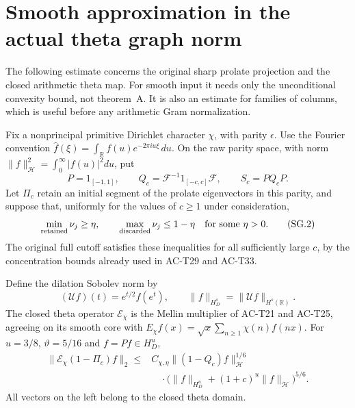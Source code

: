 \section{Smooth approximation in the actual theta graph norm}
\label{sec:spectral-prolate-graph}

The following estimate concerns the original sharp prolate
projection and the closed arithmetic theta map.  For smooth
input it needs only the unconditional convexity bound, not
theorem~A.  It is also an estimate for families of columns,
which is useful before any arithmetic Gram normalization.

\begin{theorem}
\label{AC-S29}
Fix a nonprincipal primitive Dirichlet character $\chi$,
with parity $\epsilon$.  Use the Fourier convention
$\widehat f(\xi)=\int_{\mathbb R}f(u)e^{-2\pi i u\xi}\,du$.
On the raw parity space, with norm
$\|f\|_{\mathcal H}^2=\int_0^\infty|f(u)|^2du$, put
\[
 P=1_{[-1,1]},\qquad
 Q_c=\mathcal F^{-1}1_{[-c,c]}\mathcal F,
             \qquad S_c=PQ_cP.                     \tag{SG.1}
\]
Let $\Pi_c$ retain an initial segment of the prolate
eigenvectors in this parity, and suppose that, uniformly
for the values of $c\geq1$ under consideration,
\[
 \min_{\rm retained}\nu_j\geq\eta,
       \qquad\max_{\rm discarded}\nu_j\leq1-\eta
       \quad\text{for some }\eta>0.                 \tag{SG.2}
\]
The original full cutoff satisfies these inequalities for
all sufficiently large $c$, by the concentration bounds
already used in AC-T29 and AC-T33.

Define the dilation Sobolev norm by
\[
 (\mathcal Uf)(t)=e^{t/2}f(e^t),\qquad
       \|f\|_{H_D^s}=\|\mathcal Uf\|_{H^s(\mathbb R)}.
                                                               \tag{SG.3}
\]
The closed theta operator $\mathcal E_\chi$ is the
Mellin multiplier of AC-T21 and AC-T25, agreeing on
its smooth core with
$E_\chi f(x)=\sqrt x\sum_{n\geq1}\chi(n)f(nx)$.
For $u=3/8$, $\vartheta=5/16$ and $f=Pf\in H_D^u$,
\[
 \begin{split}
 \|\mathcal E_\chi(1-\Pi_c)f\|_2
 \leq{}&C_{\chi,\eta}
        \|(1-Q_c)f\|_{\mathcal H}^{1/6}\\
 &\quad\cdot
   \bigl(\|f\|_{H_D^u}+(1+c)^u\|f\|_{\mathcal H}\bigr)^{5/6}.
 \end{split}                                        \tag{SG.4}
\]
All vectors on the left belong to the closed theta domain.


\end{theorem}
